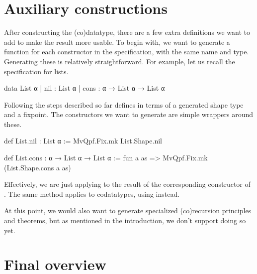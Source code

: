\section{Auxiliary constructions}%
\label{sec:aux_constructions}

After constructing the (co)datatype, there are a few extra definitions we want to add to make the result more usable. To begin with, we want to generate a function for each constructor 
in the specification, with the same name and type. Generating these is relatively straightforward.
For example, let us recall the specification for lists.
\begin{leancode}
  data List α
    | nil  : List α 
    | cons : α → List α → List α
\end{leancode}
Following the steps described so far defines  in terms of a generated shape type 
and a fixpoint. The constructors we want to generate are simple wrappers around these.
\begin{leancode}
  def List.nil : List α 
    := MvQpf.Fix.mk List.Shape.nil

  def List.cons : α → List α → List α 
    := fun a as => MvQpf.Fix.mk (List.Shape.cons a as)
\end{leancode}
Effectively, we are just applying  to the result of the corresponding constructor of .
The same method applies to codatatypes, using  instead.

At this point, we would also want to generate specialized (co)recursion principles and 
theorems, but as mentioned in the introduction, we don't support doing so yet.


\section{Final overview}%
\label{sec:procedure:overview}

